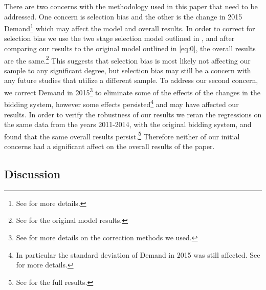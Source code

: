 There are two concerns with the methodology used in this paper that need to be addressed.
One concern is selection bias and the other is the change in 2015 Demand\footnote{See  for more details.} which may affect the model and overall results.
In order to correct for selection bias we use the two stage selection model outlined in , and after comparing our results to the original model outlined in \eqref{eq:0}, the overall results are the same.\footnote{See  for the original model results.} 
This suggests that selection bias is most likely not affecting our sample to any significant degree, but selection bias may still be a concern with any future studies that utilize a different sample.
To address our second concern, we correct Demand in 2015\footnote{See  for more details on the correction methods we used.} to eliminate some of the effects of the changes in the bidding system, however some effects persisted\footnote{In particular the standard deviation of Demand in 2015 was still affected. See  for more details.} and may have affected our results.
In order to verify the robustness of our results we reran the regressions on the same data from the years 2011-2014, with the original bidding system, and found that the same overall results persist.\footnote{See  for the full results.}
Therefore neither of our initial concerns had a significant affect on the overall results of the paper.

\subsection{Discussion}\label{results:discussion}

